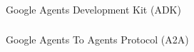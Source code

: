 \begin{frame}[fragile]\frametitle{}
\begin{center}
{\Large Google Agents Development Kit (ADK)}
\end{center}
\end{frame}

\begin{frame}[fragile]\frametitle{}
\begin{center}
{\Large Google Agents To Agents Protocol (A2A)}
\end{center}
\end{frame}
